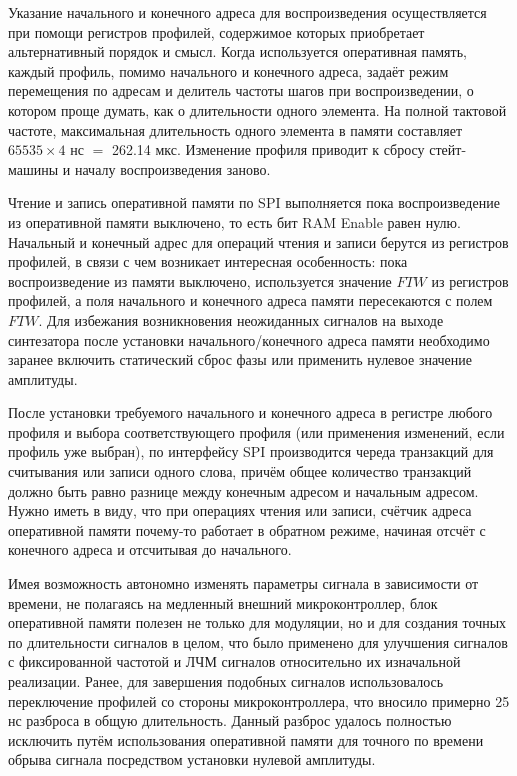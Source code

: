 \documentclass[rusmathsym, eqnumwithinsec, amspack, hyperref]{bomgost}
\begin{document}
Указание начального и конечного адреса для воспроизведения осуществляется при помощи регистров профилей, содержимое которых приобретает альтернативный порядок и смысл. Когда используется оперативная память, каждый профиль, помимо начального и конечного адреса, задаёт режим перемещения по адресам и делитель частоты шагов при воспроизведении, о котором проще думать, как о длительности одного элемента. На полной тактовой частоте, максимальная длительность одного элемента в памяти составляет $65535\times4$ нс $=$ 262.14 мкс. Изменение профиля приводит к сбросу стейт-машины и началу воспроизведения заново.

Чтение и запись оперативной памяти по SPI выполняется пока воспроизведение из оперативной памяти выключено, то есть бит RAM Enable равен нулю. Начальный и конечный адрес для операций чтения и записи берутся из регистров профилей, в связи с чем возникает интересная особенность: пока воспроизведение из памяти выключено, используется значение $FTW$ из регистров профилей, а поля начального и конечного адреса памяти пересекаются с полем $FTW$. Для избежания возникновения неожиданных сигналов на выходе синтезатора после установки начального/конечного адреса памяти необходимо заранее включить статический сброс фазы или применить нулевое значение амплитуды.

После установки требуемого начального и конечного адреса в регистре любого профиля и выбора соответствующего профиля (или применения изменений, если профиль уже выбран), по интерфейсу SPI производится череда транзакций для считывания или записи одного слова, причём общее количество транзакций должно быть равно разнице между конечным адресом и начальным адресом. Нужно иметь в виду, что при операциях чтения или записи, счётчик адреса оперативной памяти почему-то работает в обратном режиме, начиная отсчёт с конечного адреса и отсчитывая до начального.

Имея возможность автономно изменять параметры сигнала в зависимости от времени, не полагаясь на медленный внешний микроконтроллер, блок оперативной памяти полезен не только для модуляции, но и для создания точных по длительности сигналов в целом, что было применено для улучшения сигналов с фиксированной частотой и ЛЧМ сигналов относительно их изначальной реализации. Ранее, для завершения подобных сигналов использовалось переключение профилей со стороны микроконтроллера, что вносило примерно 25 нс разброса в общую длительность. Данный разброс удалось полностью исключить путём использования оперативной памяти для точного по времени обрыва сигнала посредством установки нулевой амплитуды.
\end{document}
